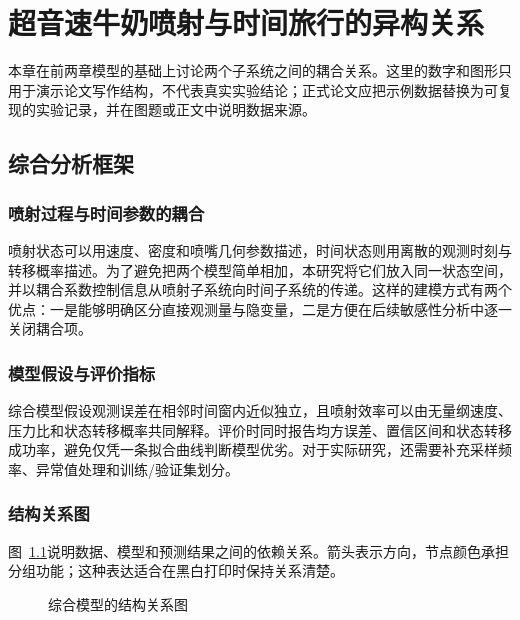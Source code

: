\chapter{超音速牛奶喷射与时间旅行的异构关系}

本章在前两章模型的基础上讨论两个子系统之间的耦合关系。这里的数字和图形只用于演示论文写作结构，不代表真实实验结论；正式论文应把示例数据替换为可复现的实验记录，并在图题或正文中说明数据来源。

\section{综合分析框架}

\subsection{喷射过程与时间参数的耦合}

喷射状态可以用速度、密度和喷嘴几何参数描述，时间状态则用离散的观测时刻与转移概率描述。为了避免把两个模型简单相加，本研究将它们放入同一状态空间，并以耦合系数控制信息从喷射子系统向时间子系统的传递。这样的建模方式有两个优点：一是能够明确区分直接观测量与隐变量，二是方便在后续敏感性分析中逐一关闭耦合项。

\subsection{模型假设与评价指标}

综合模型假设观测误差在相邻时间窗内近似独立，且喷射效率可以由无量纲速度、压力比和状态转移概率共同解释。评价时同时报告均方误差、置信区间和状态转移成功率，避免仅凭一条拟合曲线判断模型优劣。对于实际研究，还需要补充采样频率、异常值处理和训练/验证集划分。

\subsection{结构关系图}

图~\ref{fig:structure-relations}说明数据、模型和预测结果之间的依赖关系。箭头表示方向，节点颜色承担分组功能；这种表达适合在黑白打印时保持关系清楚。
\begin{figure}[htbp]
  \centering
  \caption{综合模型的结构关系图}
  \label{fig:structure-relations}
\end{figure}

